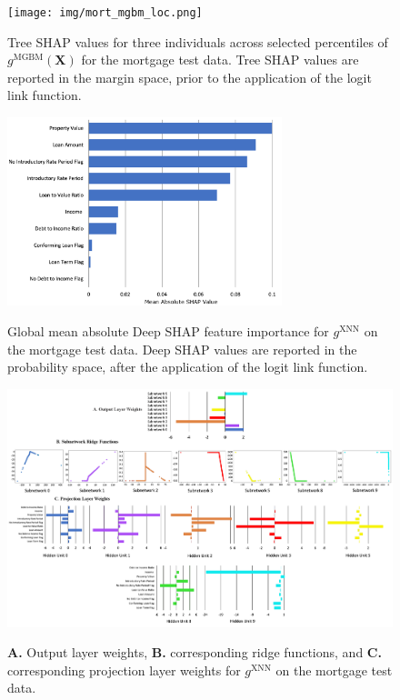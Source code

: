 \documentclass[information,article,submit,moreauthors,pdftex]{definitions/mdpi}
\begin{document}

\begin{figure}[H]
\centering
\texttt{[image: img/mort\_mgbm\_loc.png]}
\label{fig:mort_mgbm_loc}
\caption{Tree SHAP values for three individuals across selected percentiles of $g^\text{MGBM}(\mathbf{X})$ for the mortgage test data. Tree SHAP values are reported in the margin space, prior to the application of the logit link function.}
\end{figure}   

\begin{figure}[H]
\centering
\includegraphics[width=8cm]{img/mort_xnn_glob.png}
\label{fig:mort_xnn_glob}
\caption{Global mean absolute Deep SHAP feature importance for $g^\text{XNN}$ on the mortgage test data. Deep SHAP values are reported in the probability space, after the application of the logit link function.}
\end{figure} 

\begin{figure}[H]
\centering
\includegraphics[width=16cm]{img/mort_xnn_glob_ridge.png}
\label{fig:mort_xnn_glob_pdp_ice}
\caption{\textbf{A.} Output layer weights, \textbf{B.} corresponding ridge functions, and \textbf{C.} corresponding projection layer weights for $g^\text{XNN}$ on the mortgage test data.}
\end{figure}   
\end{document}
